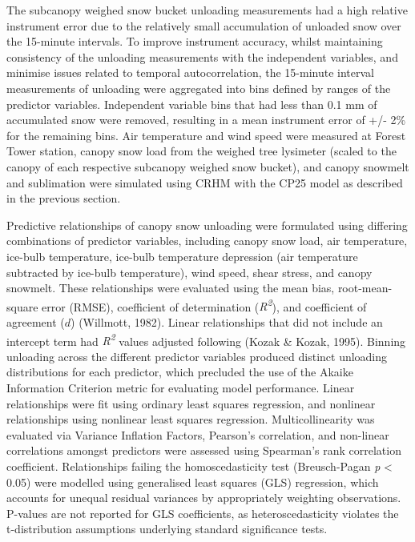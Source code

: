 \documentclass[
]{agujournal2019}
\begin{document}
The subcanopy weighed snow bucket unloading measurements had a high
relative instrument error due to the relatively small accumulation of
unloaded snow over the 15-minute intervals. To improve instrument
accuracy, whilst maintaining consistency of the unloading measurements
with the independent variables, and minimise issues related to temporal
autocorrelation, the 15-minute interval measurements of unloading were
aggregated into bins defined by ranges of the predictor variables.
Independent variable bins that had less than 0.1 mm of accumulated snow
were removed, resulting in a mean instrument error of +/- 2\% for the
remaining bins. Air temperature and wind speed were measured at Forest
Tower station, canopy snow load from the weighed tree lysimeter (scaled
to the canopy of each respective subcanopy weighed snow bucket), and
canopy snowmelt and sublimation were simulated using CRHM with the CP25
model as described in the previous section.

Predictive relationships of canopy snow unloading were formulated using
differing combinations of predictor variables, including canopy snow
load, air temperature, ice-bulb temperature, ice-bulb temperature
depression (air temperature subtracted by ice-bulb temperature), wind
speed, shear stress, and canopy snowmelt. These relationships were
evaluated using the mean bias, root-mean-square error (RMSE),
coefficient of determination (\emph{R\textsuperscript{2}}), and
coefficient of agreement (\(d\)) (Willmott, 1982). Linear relationships
that did not include an intercept term had \emph{R\textsuperscript{2}}
values adjusted following (Kozak \& Kozak, 1995). Binning unloading
across the different predictor variables produced distinct unloading
distributions for each predictor, which precluded the use of the Akaike
Information Criterion metric for evaluating model performance. Linear
relationships were fit using ordinary least squares regression, and
nonlinear relationships using nonlinear least squares regression.
Multicollinearity was evaluated via Variance Inflation Factors,
Pearson's correlation, and non-linear correlations amongst predictors
were assessed using Spearman's rank correlation coefficient.
Relationships failing the homoscedasticity test (Breusch-Pagan \emph{p}
\textless{} 0.05) were modelled using generalised least squares (GLS)
regression, which accounts for unequal residual variances by
appropriately weighting observations. P-values are not reported for GLS
coefficients, as heteroscedasticity violates the t-distribution
assumptions underlying standard significance tests.
\end{document}
